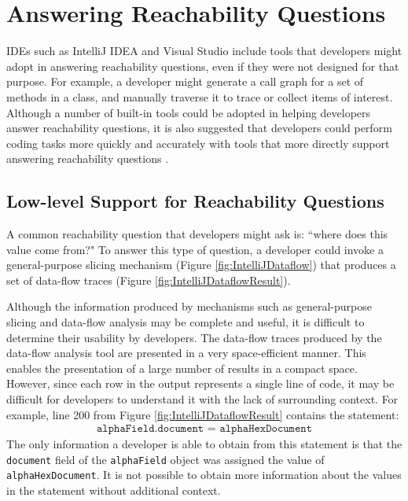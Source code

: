 \section{Answering Reachability Questions}
\label{sec:AnsweringReachabilityQuestions}

\acp{IDE} such as IntelliJ IDEA and Visual Studio include tools that developers 
might adopt in answering reachability questions, even if they were not designed
for that purpose.
For example, a developer might generate a call graph for a set of methods in a
class, and manually traverse it to trace or collect items of interest.
Although a number of built-in tools could be adopted in helping developers
answer reachability questions, it is also suggested that developers could 
perform coding tasks more quickly and accurately with tools that more directly 
support answering reachability questions \cite{latoza-2010-reach}.

\subsection{Low-level Support for Reachability Questions}
\label{subsec:LowLevelSupportReachabilityQuestions}

A common reachability question that developers might ask is: ``where does this
value come from?"
To answer this type of question, a developer could invoke a general-purpose
slicing mechanism (Figure \ref{fig:IntelliJDataflow}) that produces  a set of 
data-flow traces (Figure \ref{fig:IntelliJDataflowResult}).

\par Although the information produced by mechanisms such as general-purpose
slicing and data-flow analysis may be complete and useful, it is difficult
to determine their usability by developers.
The data-flow traces produced by the data-flow analysis tool are presented in a 
very space-efficient manner.
This enables the presentation of a large number of results in a compact space.
However, since each row in the output represents a single line of code, it may 
be difficult for developers to understand it with the lack of surrounding
context.
For example, line 200 from Figure \ref{fig:IntelliJDataflowResult} contains the
statement:
\begin{align*}
  \texttt{alphaField.document = alphaHexDocument}
\end{align*}
The only information a developer is able to obtain from this statement is that
the \texttt{document} field of the \texttt{alphaField} object was assigned
the value of \texttt{alphaHexDocument}.
It is not possible to obtain more information about the values in the statement
without additional context.


